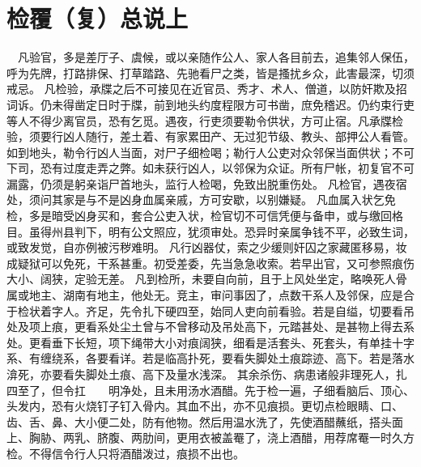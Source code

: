 \documentclass[12pt,UTF8]{ctexbook}
\begin{document}
\chapter{检覆（复）总说上}

　凡验官，多是差厅子、虞候，或以亲随作公人、家人各目前去，追集邻人保伍，呼为先牌，打路排保、打草踏路、先驰看尸之类，皆是搔扰乡众，此害最深，切须戒忌。
凡检验，承牒之后不可接见在近官员、秀才、术人、僧道，以防奸欺及招词诉。仍未得凿定日时于牒，前到地头约度程限方可书凿，庶免稽迟。仍约束行吏等人不得少离官员，恐有乞觅。遇夜，行吏须要勒令供状，方可止宿。凡承牒检验，须要行凶人随行，差土着、有家累田产、无过犯节级、教头、部押公人看管。如到地头，勒令行凶人当面，对尸子细检喝；勒行人公吏对众邻保当面供状；不可下司，恐有过度走弄之弊。如未获行凶人，以邻保为众证。所有尸帐，初复官不可漏露，仍须是躬亲诣尸首地头，监行人检喝，免致出脱重伤处。
凡检官，遇夜宿处，须问其家是与不是凶身血属亲戚，方可安歇，以别嫌疑。
凡血属入状乞免检，多是暗受凶身买和，套合公吏入状，检官切不可信凭便与备申，或与缴回格目。虽得州县判下，明有公文照应，犹须审处。恐异时亲属争钱不平，必致生词，或致发觉，自亦例被污秽难明。
凡行凶器仗，索之少缓则奸囚之家藏匿移易，妆成疑狱可以免死，干系甚重。初受差委，先当急急收索。若早出官，又可参照痕伤大小、阔狭，定验无差。
凡到检所，未要自向前，且于上风处坐定，略唤死人骨属或地主、湖南有地主，他处无。竞主，审问事因了，点数干系人及邻保，应是合于检状着字人。齐足，先令扎下硬四至，始同人吏向前看验。若是自缢，切要看吊处及项上痕，更看系处尘土曾与不曾移动及吊处高下，元踏甚处、是甚物上得去系处。更看垂下长短，项下绳带大小对痕阔狭，细看是活套头、死套头，有单挂十字系、有缠绕系，各要看详。若是临高扑死，要看失脚处土痕踪迹、高下。若是落水渰死，亦要看失脚处土痕、高下及量水浅深。
其余杀伤、病患诸般非理死人，扎四至了，但令扛　　明净处，且未用汤水酒醋。先于检一遍，子细看脑后、顶心、头发内，恐有火烧钉子钉入骨内。其血不出，亦不见痕损。更切点检眼睛、口、齿、舌、鼻、大小便二处，防有他物。然后用温水洗了，先使酒醋蘸纸，搭头面上、胸胁、两乳、脐腹、两肋间，更用衣被盖罨了，浇上酒醋，用荐席罨一时久方检。不得信令行人只将酒醋泼过，痕损不出也。
\end{document}
